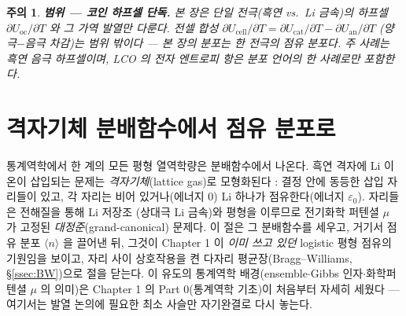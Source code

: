 \documentclass[11pt,a4paper]{article}
\newtheorem*{warnbox}{주의}
\newcommand{\oc}{\mathrm{oc}}
\newcommand{\avg}[1]{\langle #1\rangle}
\begin{document}
\begin{warnbox}
\textbf{범위 — 코인 하프셀 단독.} 본 장은 단일 전극(흑연 vs.\ Li 금속)의 하프셀 $\partial U_\oc/\partial T$ 와
그 가역 발열만 다룬다. 전셀 합성 $\partial U_\mathrm{cell}/\partial T=\partial U_\mathrm{cat}/\partial T-\partial
U_\mathrm{an}/\partial T$ (양극$-$음극 차감)는 \emph{범위 밖}이다 — 본 장의 분포는 한 전극의 점유 분포다.
주 사례는 흑연 음극 하프셀이며, LCO 의 전자 엔트로피 항은 분포 언어의 한 사례로만 포함한다.
\end{warnbox}

\section{격자기체 분배함수에서 점유 분포로}\label{sec:partition}
통계역학에서 한 계의 모든 평형 열역학량은 분배함수에서 나온다. 흑연 격자에 Li 이온이 삽입되는 문제는
\emph{격자기체}(lattice gas)로 모형화된다 \cite{newman,huggins2009}: 결정 안에 동등한 삽입 자리들이 있고,
각 자리는 비어 있거나(에너지 0) Li 하나가 점유한다(에너지 $\varepsilon_0$). 자리들은 전해질을 통해 Li 저장조
(상대극 Li 금속)와 평형을 이루므로 전기화학 퍼텐셜 $\mu$ 가 고정된 \emph{대정준}(grand-canonical) 문제다.
이 절은 그 분배함수를 세우고, 거기서 점유 분포 $\avg{n}$ 을 끌어낸 뒤, 그것이 Chapter 1 이 \emph{이미 쓰고
있던} logistic 평형 점유의 기원임을 보이고, 자리 사이 상호작용을 켠 다자리 평균장(Bragg--Williams,
\S\ref{ssec:BW})으로 절을 닫는다. 이 유도의 통계역학 배경(ensemble$\cdot$Gibbs 인자$\cdot$화학퍼텐셜
$\mu$ 의 의미)은 Chapter 1 의 Part 0(통계역학 기초)이 처음부터 자세히 세웠다 — 여기서는 발열 논의에 필요한
최소 사슬만 자기완결로 다시 놓는다.
\end{document}
